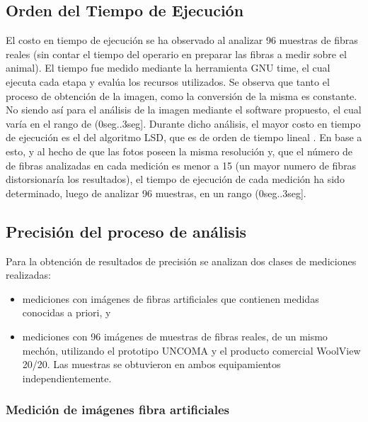 \documentclass[runningheads,a4paper]{llncs}
\begin{document}
\subsection{Orden del Tiempo de Ejecución}
El costo en tiempo de ejecución se ha observado al analizar 96 muestras de fibras reales (sin contar el tiempo del operario en preparar las fibras a medir sobre el animal). El tiempo fue medido mediante la herramienta GNU time, el cual ejecuta cada etapa y evalúa los recursos utilizados. Se observa que tanto el proceso de obtención de la imagen, como la conversión de la misma es constante. No siendo así para el análisis de la imagen mediante el software propuesto, el cual varía en el rango de (0seg..3seg]. 
Durante dicho análisis, el mayor costo en tiempo de ejecución es el del algoritmo LSD, que es de orden de tiempo lineal \cite{lsd}. En base a esto, y al hecho de que las fotos poseen la misma resolución y, que el número de de fibras analizadas en cada medición es menor a 15 (un mayor numero de fibras distorsionaría los resultados), el tiempo de ejecución de cada medición ha sido determinado, luego de analizar 96 muestras, en un rango (0seg..3seg].

\subsection{Precisión del proceso de análisis}

Para la obtención de resultados de precisión se analizan dos clases de mediciones realizadas: 
\begin{itemize}
\item mediciones con imágenes de fibras artificiales que contienen medidas conocidas a priori, y
\item mediciones con 96 imágenes de muestras de fibras reales, de un mismo mechón, utilizando el prototipo UNCOMA y el producto comercial WoolView 20/20. Las muestras se obtuvieron en ambos equipamientos independientemente.
\end{itemize}

\subsubsection{Medición de imágenes fibra artificiales}
\end{document}
